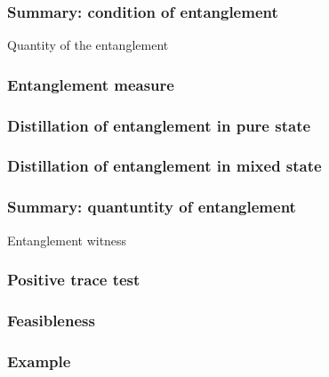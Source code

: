 \documentclass[9pt]{beamer}
\begin{document}
    \begin{frame}
        \frametitle{Summary: condition of entanglement}
        
    \end{frame}

    \begin{section}{Quantity of the entanglement}
        \begin{frame}
            \frametitle{Entanglement measure}
            
        \end{frame}

        \begin{frame}
            \frametitle{Distillation of entanglement in pure state}
            
        \end{frame}

        \begin{frame}
            \frametitle{Distillation of entanglement in mixed state}
            
        \end{frame}
    \end{section}


    \begin{frame}
        \frametitle{Summary: quantuntity of entanglement}
        
    \end{frame}

    \begin{section}{Entanglement witness}
        \begin{frame}
            \frametitle{Positive trace test}
            
        \end{frame}
        
        \begin{frame}
            \frametitle{Feasibleness}
            
        \end{frame}
        
        \begin{frame}
            \frametitle{Example}
            
        \end{frame}
    \end{section}
\end{document}

